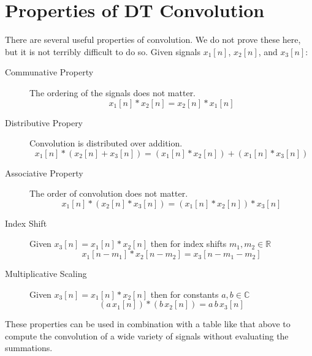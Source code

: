 \section{Properties of DT Convolution}
There are several useful properties of convolution. We do not prove these here, but it is not terribly difficult to do so. Given signals $x_1[n]$, $x_2[n]$, and $x_3[n]$:

\begin{description}
\item [Communative Property] The ordering of the signals does not matter.
  \[
x_1[n] * x_2[n] = x_2[n] * x_1[n]
  \]
\item [Distributive Propery] Convolution is distributed over addition.
  \[
  x_1[n] * \left(x_2[n] + x_3[n]\right) = \left(x_1[n] * x_2[n] \right) + \left(x_1[n] * x_3[n] \right) 
  \]
\item [Associative Property] The order of convolution does not matter.
    \[
  x_1[n] * \left(x_2[n] * x_3[n]\right) = \left(x_1[n] * x_2[n] \right) * x_3[n] 
  \]
\item [Index Shift] Given $x_3[n] = x_1[n] * x_2[n]$ then for index shifts $m_1, m_2 \in \mathbb{R}$
  \[
  x_1[n-m_1] * x_2[n-m_2] = x_3[n-m_1 - m_2]
  \]
\item [Multiplicative Scaling] Given $x_3[n] = x_1[n] * x_2[n]$ then for constants $a,b \in \mathbb{C}$
  \[
  \left(a\, x_1[n]\right) * \left(b\, x_2[n]\right) = a\, b\, x_3[n]
  \]
\end{description}

These properties can be used in combination with a table like that above to compute the convolution of a wide variety of signals without evaluating the summations.

